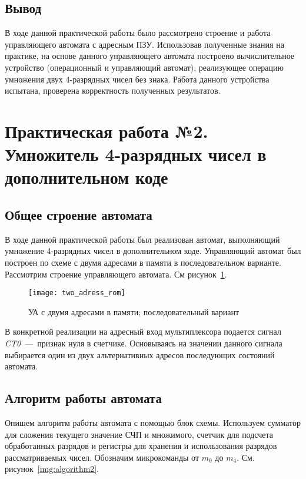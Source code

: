 \documentclass[a4paper,14pt]{extarticle}
\begin{document}
\subsection {Вывод}
В ходе данной практической работы было рассмотрено строение и работа управляющего автомата с адресным ПЗУ. Использовав полученные знания на практике, на основе данного управляющего автомата построено вычислительное устройство (операционный и управляющий автомат), реализующее операцию умножения двух 4-разрядных чисел без знака. Работа данного устройства испытана, проверена корректность полученных результатов. 
\newpage
\section {Практическая работа №2.\\Умножитель 4-разрядных чисел в дополнительном коде }
\subsection{Общее строение автомата}
В ходе данной практической работы был реализован автомат, выполняющий умножение 4-разрядных чисел в дополнительном коде. Управляющий автомат был построен по схеме с двумя адресами в памяти в последовательном варианте. Рассмотрим строение управляющего автомата. См рисунок~\ref{img:scheme2}.

\begin{figure}[h!]
	\begin{center}
		\texttt{[image: two\_adress\_rom]}
		\caption{УА с двумя адресами в памяти; последовательный вариант}
		\label{img:scheme2}
	\end{center}	
\end{figure}

В конкретной реализации на адресный вход мультиплексора подается сигнал \textit{CT0}~---~признак нуля в счетчике. Основываясь на значении данного сигнала выбирается один из двух альтернативных адресов последующих состояний автомата.

\subsection{Алгоритм работы автомата}
Опишем алгоритм работы автомата с помощью блок схемы. Используем сумматор для сложения текущего значение СЧП и множимого, счетчик для подсчета обработанных разрядов и регистры для хранения и использования разрядов рассматриваемых чисел. Обозначим микрокоманды от $m_0$ до $m_4$. См. рисунок~\ref{img:algorithm2}.\vspace{2ex}
\end{document}
